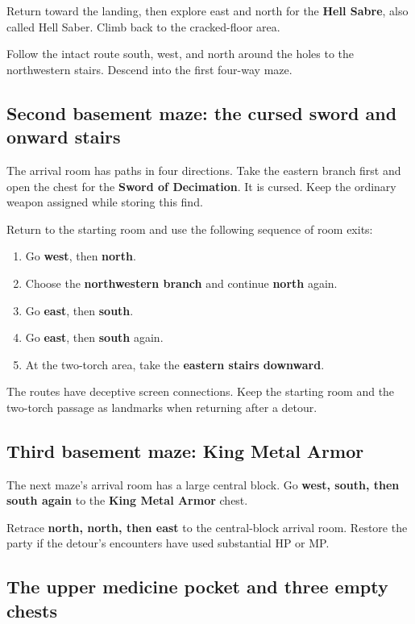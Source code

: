 Return toward the landing, then explore east and north
for the \textbf{Hell Sabre}, also called Hell Saber.
Climb back to the cracked-floor area.

Follow the intact route south, west, and north around
the holes to the northwestern stairs. Descend into
the first four-way maze.

\subsection*{Second basement maze: the cursed sword and onward stairs}

The arrival room has paths in four directions.
Take the eastern branch first and open the chest for
the \textbf{Sword of Decimation}. It is cursed.
Keep the ordinary weapon assigned while storing this find.

Return to the starting room and use the following
sequence of room exits:
\begin{enumerate}
  \item Go \textbf{west}, then \textbf{north}.
  \item Choose the \textbf{northwestern branch} and
    continue \textbf{north} again.
  \item Go \textbf{east}, then \textbf{south}.
  \item Go \textbf{east}, then \textbf{south} again.
  \item At the two-torch area, take the \textbf{eastern
    stairs downward}.
\end{enumerate}

The routes have deceptive screen connections. Keep the
starting room and the two-torch passage as landmarks
when returning after a detour.

\subsection*{Third basement maze: King Metal Armor}

The next maze's arrival room has a large central block.
Go \textbf{west, south, then south again} to the
\textbf{King Metal Armor} chest.

Retrace \textbf{north, north, then east} to the
central-block arrival room. Restore the party if the
detour's encounters have used substantial HP or MP.

\subsection*{The upper medicine pocket and three empty chests}

